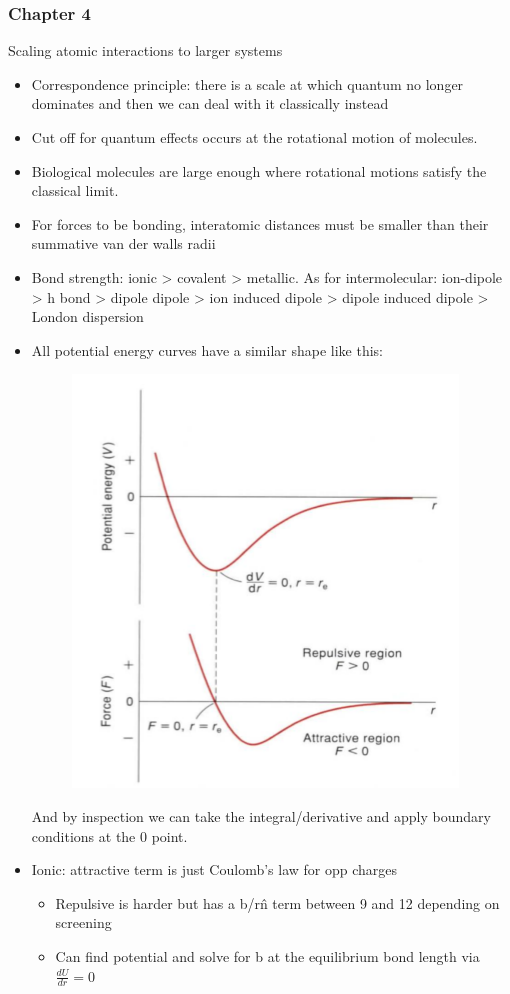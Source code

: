 \documentclass[10pt]{article}
\begin{document}
\subsubsection{Chapter 4}
Scaling atomic interactions to larger systems
\begin{itemize}
	\item Correspondence principle: there is a scale at which quantum no longer dominates and then we can deal with it classically instead
	\item Cut off for quantum effects occurs at the rotational motion of molecules.
	\item Biological molecules are large enough where rotational motions satisfy the classical limit.
	\item For forces to be bonding, interatomic distances must be smaller than their summative van der walls radii
	\item Bond strength: ionic > covalent > metallic. As for intermolecular: ion-dipole > h bond > dipole dipole > ion induced dipole > dipole induced dipole > London dispersion
	\item All potential energy curves have a similar shape like this:
		\begin{figure}[H]
			\centering
			\includegraphics[width=0.8\linewidth]{img/image_2022-04-19-12-59-31.png}
		\end{figure}

		And by inspection we can take the integral/derivative and apply boundary conditions at the 0 point.
	\item Ionic: attractive term is just Coulomb's law for opp charges
	\begin{itemize}
		\item Repulsive is harder but has a b/r\^n term between 9 and 12 depending on screening
		\item Can find potential and solve for b at the equilibrium bond length via  $ \frac{dU}{dr} = 0 $ 
	\end{itemize}


\end{itemize}
\end{document}
